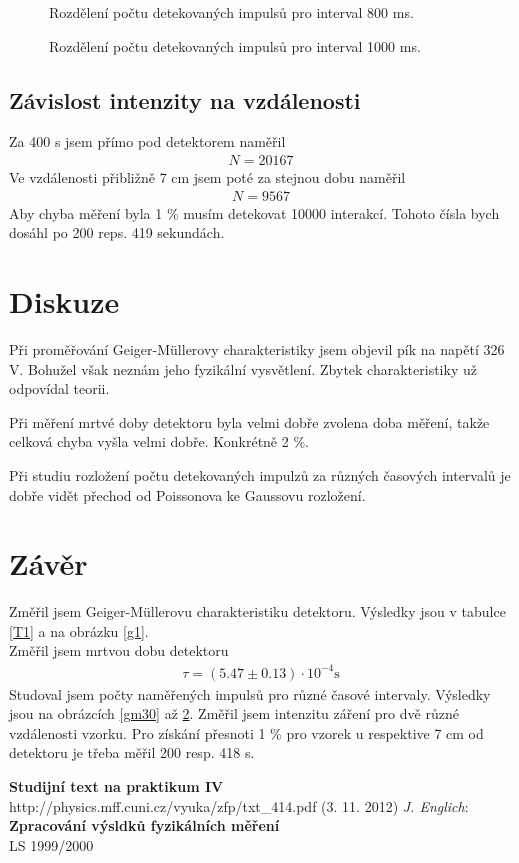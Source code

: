 \documentclass[a4paper,12pt]{article}
\begin{document}
\begin{figure}
\begin{center}

\end{center}
\caption{Rozdělení počtu detekovaných impulsů pro interval 800 ms.}
\label{gm800}
\end{figure}


\begin{figure}
\begin{center}

\end{center}
\caption{Rozdělení počtu detekovaných impulsů pro interval 1000 ms.}
\label{gm1000}
\end{figure}

\subsection{Závislost intenzity na vzdálenosti}
Za 400 s jsem přímo pod detektorem naměřil
\begin{eqnarray}
N=20167
\end{eqnarray}
Ve vzdálenosti přibližně 7 cm jsem poté za stejnou dobu naměřil
\begin{eqnarray}
N=9567
\end{eqnarray}
Aby chyba měření byla 1 \% musím detekovat 10000 interakcí. Tohoto čísla bych dosáhl po
200 reps. 419 sekundách.

\section{Diskuze}
Při proměřování Geiger-Müllerovy charakteristiky jsem objevil pík na napětí 326 V. 
Bohužel však neznám jeho fyzikální vysvětlení. Zbytek charakteristiky už odpovídal teorii. 

Při měření mrtvé doby detektoru byla velmi dobře zvolena doba měření, takže celková 
chyba vyšla velmi dobře. Konkrétně 2 \%.

Při studiu rozložení počtu detekovaných impulzů za různých časových intervalů je dobře vidět přechod od Poissonova ke Gaussovu rozložení.

\section{Závěr}
Změřil jsem Geiger-Müllerovu charakteristiku detektoru. Výsledky jsou v tabulce \ref{T1} a na obrázku \ref{g1}. \\
Změřil jsem mrtvou dobu detektoru
\begin{eqnarray}
\tau=(5.47\pm 0.13)\cdot 10^{-4} \mbox{s}
\end{eqnarray}
Studoval jsem počty naměřených impulsů pro různé časové intervaly. Výsledky jsou na obrázcích \ref{gm30} až \ref{gm1000}.
Změřil jsem intenzitu záření pro dvě různé vzdálenosti vzorku. Pro získání přesnoti 1 \% pro vzorek u respektive 7 cm od detektoru je třeba měřil 200 resp. 418 s.

\begin{thebibliography}{5}
	 \textbf{Studijní text na praktikum IV} \\http://physics.mff.cuni.cz/vyuka/zfp/txt\_414.pdf (3. 11. 2012)
     \emph{J. Englich}: \textbf{Zpracování výsldků fyzikálních měření} \\ LS 1999/2000
\end{thebibliography}
\end{document}
